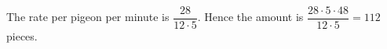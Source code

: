 The rate per pigeon per minute is $\dfrac{28}{12\cdot5}$. Hence the amount is $\dfrac{28\cdot5\cdot48}{12\cdot5}=\boxed{112}$ pieces.
